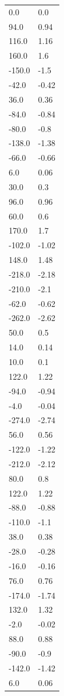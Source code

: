 \begin{longtable}{ll}
0.0 & 0.0 \\
94.0 & 0.94 \\
116.0 & 1.16 \\
160.0 & 1.6 \\
-150.0 & -1.5 \\
-42.0 & -0.42 \\
36.0 & 0.36 \\
-84.0 & -0.84 \\
-80.0 & -0.8 \\
-138.0 & -1.38 \\
-66.0 & -0.66 \\
6.0 & 0.06 \\
30.0 & 0.3 \\
96.0 & 0.96 \\
60.0 & 0.6 \\
170.0 & 1.7 \\
-102.0 & -1.02 \\
148.0 & 1.48 \\
-218.0 & -2.18 \\
-210.0 & -2.1 \\
-62.0 & -0.62 \\
-262.0 & -2.62 \\
50.0 & 0.5 \\
14.0 & 0.14 \\
10.0 & 0.1 \\
122.0 & 1.22 \\
-94.0 & -0.94 \\
-4.0 & -0.04 \\
-274.0 & -2.74 \\
56.0 & 0.56 \\
-122.0 & -1.22 \\
-212.0 & -2.12 \\
80.0 & 0.8 \\
122.0 & 1.22 \\
-88.0 & -0.88 \\
-110.0 & -1.1 \\
38.0 & 0.38 \\
-28.0 & -0.28 \\
-16.0 & -0.16 \\
76.0 & 0.76 \\
-174.0 & -1.74 \\
132.0 & 1.32 \\
-2.0 & -0.02 \\
88.0 & 0.88 \\
-90.0 & -0.9 \\
-142.0 & -1.42 \\
6.0 & 0.06 \\

\end{longtable}
